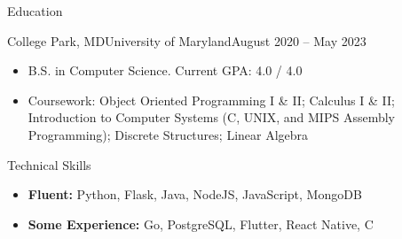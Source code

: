 \documentclass[]{mcdowellcv}
\begin{document}
	\makeheader
	
	\begin{cvsection}{Education}
		\begin{cvsubsection}{College Park, MD}{University of Maryland}{August 2020 -- May 2023}
			\begin{itemize}
				\item B.S. in Computer Science. Current GPA: 4.0 / 4.0
				\item Coursework: Object Oriented Programming I \& II; Calculus I \& II; Introduction to Computer Systems (C, UNIX, and MIPS Assembly Programming); Discrete Structures; Linear Algebra
			\end{itemize}
		\end{cvsubsection}
	\end{cvsection}

	\begin{cvsection}{Technical Skills}
		\begin{cvsubsection}{}{}{}
			\vspace{0.5em}
			\begin{itemize}
				\item \textbf{Fluent:} Python, Flask, Java, NodeJS, JavaScript, MongoDB
				\item \textbf{Some Experience:} Go, PostgreSQL, Flutter, React Native, C
			\end{itemize}		
		\end{cvsubsection}
	\end{cvsection}
\end{document}
